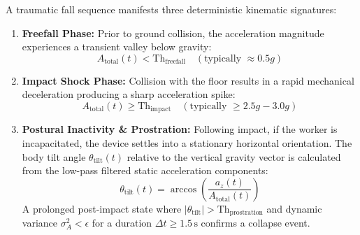 A traumatic fall sequence manifests three deterministic kinematic signatures:
\begin{enumerate}
    \item \textbf{Freefall Phase:} Prior to ground collision, the acceleration magnitude experiences a transient valley below gravity:
    \begin{equation}
    A_{\text{total}}(t) < \text{Th}_{\text{freefall}} \quad (\text{typically } \approx 0.5g)
    \end{equation}
    \item \textbf{Impact Shock Phase:} Collision with the floor results in a rapid mechanical deceleration producing a sharp acceleration spike:
    \begin{equation}
    A_{\text{total}}(t) \ge \text{Th}_{\text{impact}} \quad (\text{typically } \ge 2.5g - 3.0g)
    \end{equation}
    \item \textbf{Postural Inactivity \& Prostration:} Following impact, if the worker is incapacitated, the device settles into a stationary horizontal orientation. The body tilt angle $\theta_{\text{tilt}}(t)$ relative to the vertical gravity vector is calculated from the low-pass filtered static acceleration components:
    \begin{equation}
    \label{eq:tilt_angle}
    \theta_{\text{tilt}}(t) = \arccos\left(\frac{a_z(t)}{A_{\text{total}}(t)}\right)
    \end{equation}
    A prolonged post-impact state where $|\theta_{\text{tilt}}| > \text{Th}_{\text{prostration}}$ and dynamic variance $\sigma_A^2 < \epsilon$ for a duration $\Delta t \ge 1.5\,\text{s}$ confirms a collapse event.
\end{enumerate}

